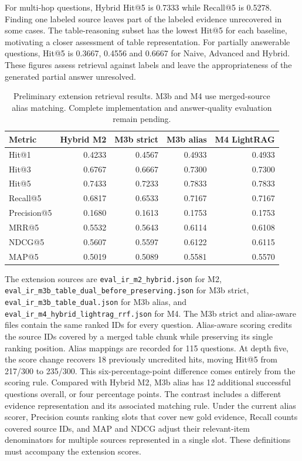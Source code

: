 \documentclass[oneside]{sn-jnl}
\newcommand{\artifact}[1]{\nolinkurl{#1}}
\begin{document}
For multi-hop questions, Hybrid Hit@5 is 0.7333 while Recall@5 is 0.5278. Finding one labeled source leaves part of the labeled evidence unrecovered in some cases. The table-reasoning subset has the lowest Hit@5 for each baseline, motivating a closer assessment of table representation. For partially answerable questions, Hit@5 is 0.3667, 0.4556 and 0.6667 for Naive, Advanced and Hybrid. These figures assess retrieval against labels and leave the appropriateness of the generated partial answer unresolved.

\begin{table}[htbp]
\centering
\caption{Preliminary extension retrieval results. M3b and M4 use merged-source alias matching. Complete implementation and answer-quality evaluation remain pending.}
\label{tab:extensions}
\begin{tabular}{lrrrr}
\toprule
Metric & Hybrid M2 & M3b strict & M3b alias & M4 LightRAG\\
\midrule
Hit@1 & 0.4233 & 0.4567 & 0.4933 & 0.4933\\
Hit@3 & 0.6767 & 0.6667 & 0.7300 & 0.7300\\
Hit@5 & 0.7433 & 0.7233 & 0.7833 & 0.7833\\
Recall@5 & 0.6817 & 0.6533 & 0.7167 & 0.7167\\
Precision@5 & 0.1680 & 0.1613 & 0.1753 & 0.1753\\
MRR@5 & 0.5532 & 0.5643 & 0.6114 & 0.6108\\
NDCG@5 & 0.5607 & 0.5597 & 0.6122 & 0.6115\\
MAP@5 & 0.5019 & 0.5089 & 0.5581 & 0.5570\\
\bottomrule
\end{tabular}
\end{table}

The extension sources are \artifact{eval_ir_m2_hybrid.json} for M2, \artifact{eval_ir_m3b_table_dual_before_preserving.json} for M3b strict, \artifact{eval_ir_m3b_table_dual.json} for M3b alias, and \artifact{eval_ir_m4_hybrid_lightrag_rrf.json} for M4. The M3b strict and alias-aware files contain the same ranked IDs for every question. Alias-aware scoring credits the source IDs covered by a merged table chunk while preserving its single ranking position. Alias mappings are recorded for 115 questions. At depth five, the score change recovers 18 previously uncredited hits, moving Hit@5 from 217/300 to 235/300. This six-percentage-point difference comes entirely from the scoring rule. Compared with Hybrid M2, M3b alias has 12 additional successful questions overall, or four percentage points. The contrast includes a different evidence representation and its associated matching rule. Under the current alias scorer, Precision counts ranking slots that cover new gold evidence, Recall counts covered source IDs, and MAP and NDCG adjust their relevant-item denominators for multiple sources represented in a single slot. These definitions must accompany the extension scores.
\end{document}
